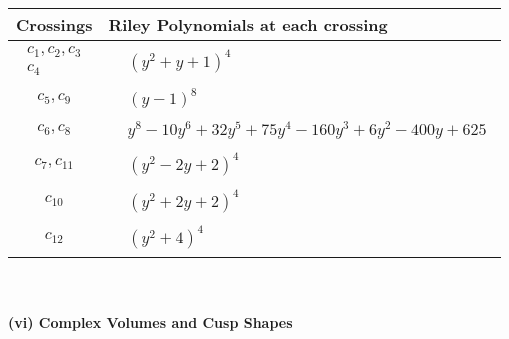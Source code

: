 \documentclass[1p]{elsarticle_modified}
\theoremstyle{definition}
\begin{document}
\begin{tabular}{m{50pt}|m{274pt}}
Crossings & \hspace{64pt}Riley Polynomials at each crossing \\
\hline $$\begin{aligned}c_{1},c_{2},c_{3}\\c_{4}\end{aligned}$$&$\begin{aligned}
&(y^2+y+1)^4
\end{aligned}$\\
\hline $$\begin{aligned}c_{5},c_{9}\end{aligned}$$&$\begin{aligned}
&(y-1)^8
\end{aligned}$\\
\hline $$\begin{aligned}c_{6},c_{8}\end{aligned}$$&$\begin{aligned}
&y^8-10 y^6+32 y^5+75 y^4-160 y^3+6 y^2-400 y+625
\end{aligned}$\\
\hline $$\begin{aligned}c_{7},c_{11}\end{aligned}$$&$\begin{aligned}
&(y^2-2 y+2)^4
\end{aligned}$\\
\hline $$\begin{aligned}c_{10}\end{aligned}$$&$\begin{aligned}
&(y^2+2 y+2)^4
\end{aligned}$\\
\hline $$\begin{aligned}c_{12}\end{aligned}$$&$\begin{aligned}
&(y^2+4)^4
\end{aligned}$\\
\hline
\end{tabular}\\~\\
\newpage\flushleft \textbf{(vi) Complex Volumes and Cusp Shapes}
\end{document}
